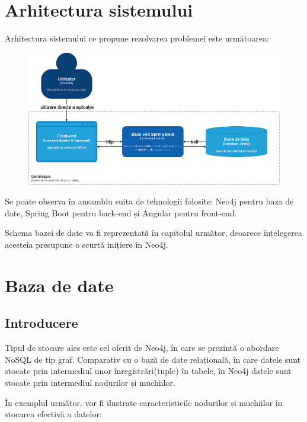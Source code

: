 \documentclass[12pt,a4paper]{report}
\begin{document}
\section{Arhitectura sistemului}

Arhitectura sistemului ce propune rezolvarea problemei este următoarea:

\begin{figure}[H]
\centering
\caption{}
\begin{adjustbox}{max size={\textwidth}{\textheight}}
\includegraphics[scale = 0.5]
{exemplu_17_diagrama_c4_nivel_1.drawio}
\end{adjustbox}
\caption*{}
\end{figure}

Se poate observa în ansamblu suita de tehnologii folosite: Neo4j pentru baza de date, Spring Boot pentru back-end și Angular pentru front-end.

Schema bazei de date va fi reprezentată în capitolul următor, deoarece înțelegerea acesteia presupune o scurtă inițiere în  Neo4j.

\newpage


\section{Baza de date}
\subsection{Introducere}

Tipul de stocare ales este cel oferit de Neo4j, în care se prezintă o abordare NoSQL de tip graf.  Comparativ cu o bază de date relațională, în care datele sunt stocate prin intermediul unor înregistrări(tuple) în tabele, în Neo4j datele sunt stocate prin intermediul nodurilor și muchiilor.

În exemplul următor, vor fi ilustrate caracteristicile nodurilor și muchiilor în stocarea efectivă a datelor:
\end{document}
